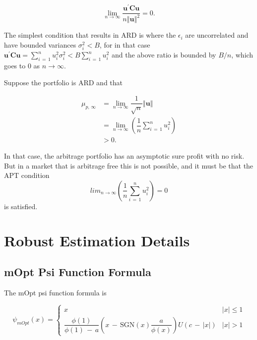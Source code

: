 \documentclass[graybox,envcountchap,sectrefs]{svmono}\usepackage[]{graphicx}\usepackage[]{xcolor}
\begin{document}
\begin{appendices}
\begin{equation}
\underset{n\rightarrow\infty}{\lim}\dfrac{\mathbf{u}^{\prime}\mathbf{C}\mathbf{u}}{n\left\Vert \ensuremath{\mathbf{u}}\right\Vert ^{2}}=0.\label{eq: asympRiskDiversifiable}
\end{equation}

The simplest condition that results in ARD is where the $\epsilon_{i}$
are uncorrelated and have bounded variances $\sigma_{i}^{2}<B$, for
in that case $\mathbf{u}^{\prime}\mathbf{C}\mathbf{u}=\sum_{i\,=\,1}^{n}u_{i}^{2}\sigma_{i}^{2}<B\sum_{i\,=\,1}^{n}u_{i}^{2}$
and the above ratio is bounded by $B/n$, which goes to 0 as $n\rightarrow\infty$.

Suppose the portfolio is ARD and that 

\begin{align*}
\mu_{p,\,\infty} & =\underset{n\rightarrow\infty}{\lim}\dfrac{1}{\sqrt{n}}\left\Vert \ensuremath{\mathbf{u}}\right\Vert \\
 & =\underset{n\rightarrow\infty}{\lim}\left(\dfrac{1}{n}\sum_{i\,=\,1}^{n}u_{i}^{2}\right)\\
 & >0.
\end{align*}

In that case, the arbitrage portfolio has an asymptotic sure profit
with no risk. But in a market that is arbitrage free this is not possible,
and it must be that the APT condition
\[
lim_{n\rightarrow\infty}\left(\dfrac{1}{n}\sum_{i\,=\,1}^{n}u_{i}^{2}\right)=0
\]
is satisfied.

\medskip{}


\section{Robust Estimation Details\label{sec: robEstDetails}}

\subsection{mOpt Psi Function Formula \label{subsec: boundedRhoPsiFormula}}

The mOpt psi function formula is

\begin{equation}
\psi_{mOpt}(x)=\begin{cases}
x & |x|\leqslant1\\
\dfrac{\phi(1)}{\phi(1)\,-\,a}\left(x\,-\,\mathrm{SGN}(x)\dfrac{a}{\phi(x)}\right)\mathrm{\mathit{U}}(c\,-\,|x|) & |x|>1
\end{cases}
\end{equation}


\end{appendices}
\end{document}
